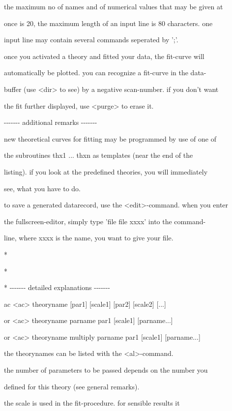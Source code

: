 \documentclass[]{article}
\begin{document}
the maximum no of names and of numerical values that may be given at

once is 20, the maximum length of an input line is 80 characters. one

input line may contain several commands seperated by ';'.

once you activated a theory and fitted your data, the fit-curve will

automatically be plotted. you can recognize a fit-curve in the data-

buffer (use \textless{}dir\textgreater{} to see) by a negative
scan-number. if you don't want

the fit further displayed, use \textless{}purge\textgreater{} to erase
it.

-\/-\/-\/-\/-\/-\/- additional remarks -\/-\/-\/-\/-\/-\/-

new theoretical curves for fitting may be programmed by use of one of

the subroutines thx1 ... thxn as templates (near the end of the

listing). if you look at the predefined theories, you will immediately

see, what you have to do.

to save a generated datarecord, use the
\textless{}edit\textgreater{}-command. when you enter

the fullscreen-editor, simply type 'file file xxxx' into the command-

line, where xxxx is the name, you want to give your file.

*

*

* -\/-\/-\/-\/-\/-\/- detailed explanations -\/-\/-\/-\/-\/-\/-

ac \textless{}ac\textgreater{} theoryname {[}par1{]} {[}scale1{]}
{[}par2{]} {[}scale2{]} {[}...{]}

or \textless{}ac\textgreater{} theoryname parname par1 {[}scale1{]}
{[}parname...{]}

or \textless{}ac\textgreater{} theoryname multiply parname par1
{[}scale1{]} {[}parname...{]}

the theorynames can be listed with the
\textless{}al\textgreater{}-command.

the number of parameters to be passed depends on the number you

defined for this theory (see general remarks).

the scale is used in the fit-procedure. for sensible results it
\end{document}
